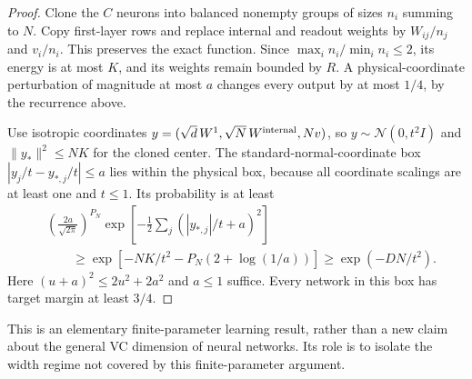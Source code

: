 \begin{proof}
Clone the $C$ neurons into balanced nonempty groups of sizes $n_i$ summing
to $N$. Copy first-layer rows and replace internal and readout weights by
$W_{ij}/n_j$ and $v_i/n_i$. This preserves the exact function. Since
$\max_i n_i/\min_i n_i\le2$, its energy is at most $K$, and its weights
remain bounded by $R$. A physical-coordinate perturbation of magnitude
at most $a$ changes every output by at most $1/4$, by the recurrence above.

Use isotropic coordinates
$y=(\sqrt d\,W^1,\sqrt N\,W^{\rm internal},Nv)$, so
$y\sim\mathcal N(0,t^2I)$ and $\|y_*\|^2\le NK$ for the cloned center.
The standard-normal-coordinate box
$|y_j/t-y_{*,j}/t|\le a$ lies within the physical box, because all coordinate
scalings are at least one and $t\le1$. Its probability is at least
\begin{align*}
 &\left(\frac{2a}{\sqrt{2\pi}}\right)^{P_N}
 \exp\left[-\frac12\sum_j(|y_{*,j}|/t+a)^2\right]\\
 &\qquad\ge\exp[-NK/t^2-P_N(2+\log(1/a))]
 \ge\exp(-DN/t^2).
\end{align*}
Here $(u+a)^2\le2u^2+2a^2$ and $a\le1$ suffice. Every network in this box
has target margin at least $3/4$.
\end{proof}

This is an elementary finite-parameter learning result, rather than a new
claim about the general VC dimension of neural networks. Its role is to
isolate the width regime not covered by this finite-parameter argument.
